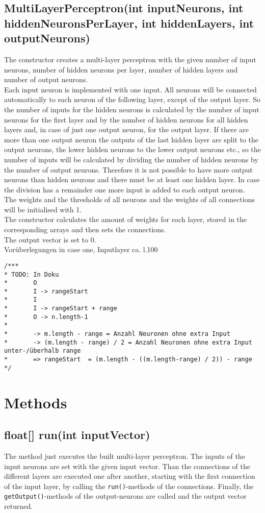 \subsection{MultiLayerPerceptron(int inputNeurons, int hiddenNeuronsPerLayer, int hiddenLayers, int outputNeurons)}
The constructor creates a multi-layer perceptron with the given number of input neurons, number of hidden neurons per layer, number of hidden layers and number of output neurons.\\
Each input neuron is implemented with one input. All neurons will be connected automatically to each neuron of the following layer, except of the output layer. So the number of inputs for the hidden neurons is calculated by the number of input neurons for the first layer and by the number of hidden neurons for all hidden layers and, in case of just one output neuron, for the output layer. If there are more than one output neuron the outputs of the last hidden layer are split to the output neurons, the lower hidden neurons to the lower output neurons etc., so the number of inputs will be calculated by dividing the number of hidden neurons by the number of output neurons. Therefore it is not possible to have more output neurons than hidden neurons and there must be at least one hidden layer. In case the division has a remainder one more input is added to each output neuron.\\
The weights and the thresholds of all neurons and the weights of all connections will be initialised with 1.\\
The constructor calculates the amount of weights for each layer, stored in the corresponding arrays and then sets the connections.\\
The output vector is set to 0.\\
Vorüberlegungen in case one, Inputlayer ca. l.100
\begin{lstlisting}
/***
* TODO: In Doku
* 		O
* 		I -> rangeStart
* 		I
* 		I -> rangeStart + range
* 		O -> n.length-1
* 
* 		-> m.length - range = Anzahl Neuronen ohne extra Input
* 		-> (m.length - range) / 2 = Anzahl Neuronen ohne extra Input unter-/überhalb range
* 		=> rangeStart  = (m.length - ((m.length-range) / 2)) - range
*/
\end{lstlisting}

\section{Methods}
\subsection{float[] run(int inputVector)}
The method just executes the built multi-layer perceptron. The inputs of the input neurons are set with the given input vector. Than the connections of the different layers are executed one after another, starting with the first connection of the input layer, by calling the \texttt{run()}-methods of the connections. Finally, the \texttt{getOutput()}-methods of the output-neurons are called and the output vector returned.

